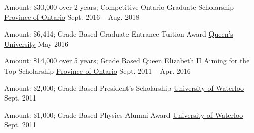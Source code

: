 \begin{cventries}
  \cventry
    {Amount: \$30,000 over 2 years; Competitive} %
    {Ontario Graduate Scholarship} %
    {\href{https://osap.gov.on.ca/OSAPPortal/en/A-ZListofAid/PRDR019245.html}{Province of Ontario}} %
    {Sept. 2016 – Aug. 2018} %
    {}

  \cventry
    {Amount: \$6,414; Grade Based} %
    {Graduate Entrance Tuition Award} %
    {\href{https://www.queensu.ca/}{Queen’s University}} %
    {May 2016} %
    {}
 
  \cventry
    {Amount: \$14,000 over 5 years; Grade Based} %
    {Queen Elizabeth II Aiming for the Top Scholarship} %
    {\href{https://www.ontario.ca/page/osap-ontario-student-assistance-program}{Province of Ontario}} %
    {Sept. 2011 – Apr. 2016} %
    {}
 
  \cventry
    {Amount: \$2,000; Grade Based} %
    {President’s Scholarship} %
    {\href{https://uwaterloo.ca/}{University of Waterloo}} %
    {Sept. 2011} %
    {}
 
  \cventry
    {Amount: \$1,000; Grade Based} %
    {Physics Alumni Award} %
    {\href{https://uwaterloo.ca/}{University of Waterloo}} %
    {Sept. 2011} %
    {}
 
\end{cventries}
